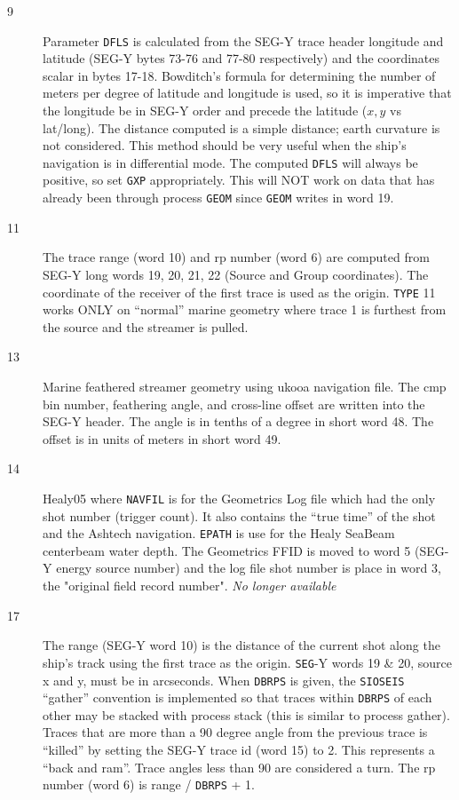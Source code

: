 \begin{description}
\begin{description}
\item[9] Parameter \texttt{DFLS} is calculated from the SEG-Y trace header
         longitude and latitude (SEG-Y bytes 73-76 and 77-80 respectively)
         and the coordinates scalar in bytes 17-18.  Bowditch's formula
         for determining the number of meters per degree of latitude
         and longitude is used, so it is imperative that the longitude
         be in SEG-Y order and precede the latitude ($x,y$ vs lat/long).
         The distance computed is a simple distance; earth curvature is
         not considered.  This method should be very useful when the
         ship's navigation is in differential mode.  The computed \texttt{DFLS}
         will always be positive, so set \texttt{GXP} appropriately.  This will
         NOT work on data that has already been through process \texttt{GEOM} since
         \texttt{GEOM} writes in word 19.

\item[11] The trace range (word 10) and \gls{rp} number (word 6) are computed
         from SEG-Y long words 19, 20, 21, 22 (Source and Group
         coordinates).  The coordinate of the receiver of the first
         trace is used as the origin.  \texttt{TYPE} 11 works ONLY on ``normal''
         marine geometry where trace 1 is furthest from the source
         and the streamer is pulled.

\item[13] Marine feathered streamer geometry using \gls{ukooa} navigation file.
         The \gls{cmp} bin number, feathering angle, and cross-line offset
         are written into the SEG-Y header.  The angle is in tenths of
         a degree in short word 48.  The offset is in units of meters
         in short word 49.

\item[14] Healy05 where \texttt{NAVFIL} is for the  Geometrics Log file which had
         the only \gls{shot} number (trigger count).  It also contains the
         ``true time'' of the \gls{shot} and the Ashtech navigation.  \texttt{EPATH}
         is use for the Healy SeaBeam centerbeam water depth.  The
         Geometrics FFID is moved to word 5 (SEG-Y energy source number)
         and the log file \gls{shot} number is place in word 3, the "original
         field record number".  \emph{No longer available}

\item[17] The range (SEG-Y word 10) is the distance of the current \gls{shot}
         along the ship's track using the first trace as the origin.
         \texttt{SEG}-Y words 19 \& 20, source x and y, must be in arcseconds.
         When \texttt{DBRPS} is given, the \texttt{SIOSEIS} ``gather'' convention is
         implemented so that traces within \texttt{DBRPS} of each other may be
         stacked with process stack (this is similar to process gather).
         Traces that are more than a 90 degree angle from the previous
         trace is ``killed'' by setting the SEG-Y trace id (word 15) to 2.
         This represents a ``back and ram''.  Trace angles less than 90
         are considered a turn.  The \gls{rp} number (word 6) is
         range / \texttt{DBRPS} + 1.


\end{description}
\end{description}
